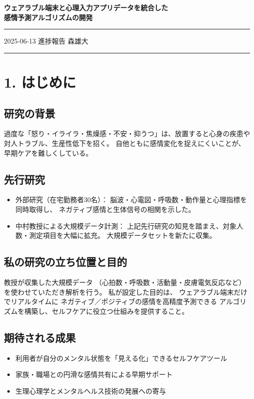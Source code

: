 \documentclass[a4paper,11pt]{article}
\begin{document}
\begin{center}
  {\LARGE \bfseries ウェアラブル端末と心理入力アプリデータを統合した\\感情予測アルゴリズムの開発}\\[6ex]
\end{center}

\hrule\vspace{1ex}
{\normalsize 2025-06-13 進捗報告 \hfill 森雄大}\\
\hrule\vspace{5ex}

\section*{1. はじめに}
\subsection*{研究の背景}
過度な「怒り・イライラ・焦燥感・不安・抑うつ」は、放置すると心身の疾患や対人トラブル、生産性低下を招く。  
自他ともに感情変化を捉えにくいことが、早期ケアを難しくしている。

\subsection*{先行研究}
\begin{itemize}
  \item 外部研究（在宅勤務者30名）：  
        脳波・心電図・呼吸数・動作量と心理指標を同時取得し、  
        ネガティブ感情と生体信号の相関を示した。
  \item 中村教授による大規模データ計測：  
        上記先行研究の知見を踏まえ、対象人数・測定項目を大幅に拡充。  
        大規模データセットを新たに収集。
\end{itemize}

\subsection*{私の研究の立ち位置と目的}
教授が収集した大規模データ  
（心拍数・呼吸数・活動量・皮膚電気反応など）を使わせていただき解析を行う。  
私が設定した目的は、  
ウェアラブル端末だけでリアルタイムに  
ネガティブ／ポジティブの感情を高精度予測できる  
アルゴリズムを構築し、セルフケアに役立つ仕組みを提供すること。

\subsection*{期待される成果}
\begin{itemize}
  \item 利用者が自分のメンタル状態を「見える化」できるセルフケアツール
  \item 家族・職場との円滑な感情共有による早期サポート
  \item 生理心理学とメンタルヘルス技術の発展への寄与
\end{itemize}
\end{document}
